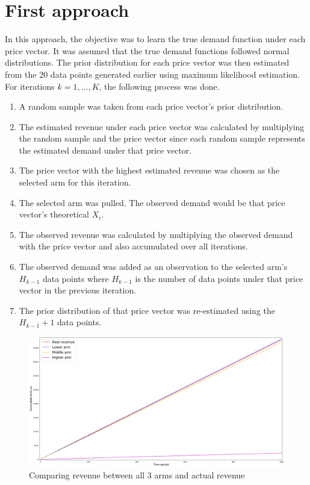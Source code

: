 \documentclass[a4paper]{article}
\begin{document}
\section{First approach}
In this approach, the objective was to learn the true demand function under each price vector. It was assumed that the true demand functions followed normal distributions. The prior distribution for each price vector was then estimated from the 20 data points generated earlier using maximum likelihood estimation. 
\newline
\newline
For iterations $k = 1,...,K$, the following process was done. 
\begin{enumerate}
	\item A random sample was taken from each price vector's prior distribution.
	\item The estimated revenue under each price vector was calculated by multiplying the random sample and the price vector since each random sample represents the estimated demand under that price vector.
	\item The price vector with the highest estimated revenue was chosen as the selected arm for this iteration.
	\item The selected arm was pulled. The observed demand would be that price vector's theoretical $X_i$.
	\item The observed revenue was calculated by multiplying the observed demand with the price vector and also accumulated over all iterations.
	\item The observed demand was added as an observation to the selected arm's $H_{k-1}$ data points where $H_{k-1}$ is the number of data points under that price vector in the previous iteration.
	\item The prior distribution of that price vector was re-estimated using the $H_{k-1} + 1$ data points.
\end{enumerate}
\begin{figure}
	\centering
	\includegraphics[width=1\textwidth]{approach1.png}
	\caption{\label{fig:one}Comparing revenue between all 3 arms and actual revenue}
\end{figure}
\end{document}
